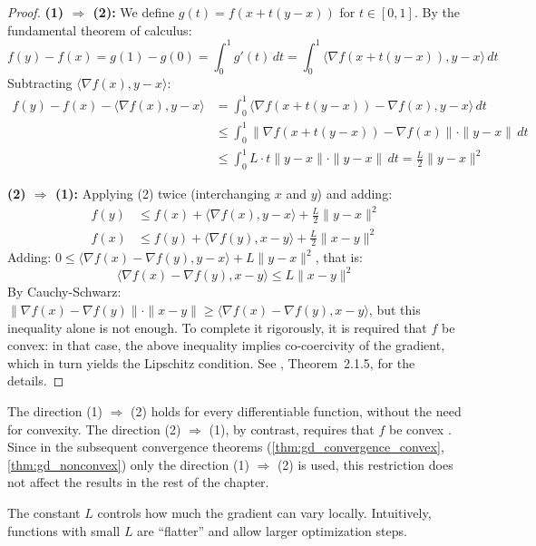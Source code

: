 \begin{proof}
	\textbf{(1) \(\Rightarrow\) (2):} We define \(g(t) = f(x + t(y-x))\) for \(t \in [0,1]\). By the fundamental theorem of calculus:
	\[
		f(y) - f(x) = g(1) - g(0) = \int_0^1 g'(t) \, dt = \int_0^1 \langle \nabla f(x + t(y-x)), y-x \rangle \, dt
	\]
	Subtracting \(\langle \nabla f(x), y-x \rangle\):
	\begin{align*}
		f(y) - f(x) - \langle \nabla f(x), y-x \rangle &= \int_0^1 \langle \nabla f(x + t(y-x)) - \nabla f(x), y-x \rangle \, dt \\
		&\leq \int_0^1 \|\nabla f(x + t(y-x)) - \nabla f(x)\| \cdot \|y-x\| \, dt \\
		&\leq \int_0^1 L \cdot t\|y-x\| \cdot \|y-x\| \, dt = \frac{L}{2}\|y-x\|^2
	\end{align*}

	\textbf{(2) \(\Rightarrow\) (1):} Applying (2) twice (interchanging \(x\) and \(y\)) and adding:
	\begin{align*}
		f(y) &\leq f(x) + \langle \nabla f(x), y-x \rangle + \frac{L}{2}\|y-x\|^2 \\
		f(x) &\leq f(y) + \langle \nabla f(y), x-y \rangle + \frac{L}{2}\|x-y\|^2
	\end{align*}
	Adding: \(0 \leq \langle \nabla f(x) - \nabla f(y), y-x \rangle + L\|y-x\|^2\), that is:
	\[
		\langle \nabla f(x) - \nabla f(y), x-y \rangle \leq L\|x-y\|^2
	\]
	By Cauchy-Schwarz: \(\|\nabla f(x) - \nabla f(y)\| \cdot \|x-y\| \geq \langle \nabla f(x) - \nabla f(y), x-y \rangle\), but this inequality alone is not enough. To complete it rigorously, it is required that \(f\) be convex: in that case, the above inequality implies co-coercivity of the gradient, which in turn yields the Lipschitz condition. See \citet{Nesterov2018}, Theorem~2.1.5, for the details.
\end{proof}

\begin{remark}
	The direction (1) \(\Rightarrow\) (2) holds for every differentiable function, without the need for convexity. The direction (2) \(\Rightarrow\) (1), by contrast, requires that \(f\) be convex \citep[Theorem~2.1.5]{Nesterov2018}. Since in the subsequent convergence theorems (\autoref{thm:gd_convergence_convex}, \autoref{thm:gd_nonconvex}) only the direction (1) \(\Rightarrow\) (2) is used, this restriction does not affect the results in the rest of the chapter.
\end{remark}

The constant \(L\) controls how much the gradient can vary locally. Intuitively, functions with small \(L\) are ``flatter'' and allow larger optimization steps.

